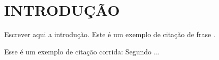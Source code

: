 \section{INTRODUÇÃO}
\label{sec:intro}

Escrever aqui a introdução. Este é um exemplo de citação de frase \cite{Diakogiannis2020}.


Esse é um exemplo de citação corrida: Segundo ...